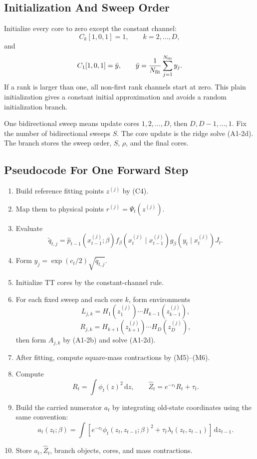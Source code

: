 \documentclass[11pt]{article}
\newcommand{\dd}{\,\mathrm d}
\begin{document}
\subsection{Initialization And Sweep Order}

Initialize every core to zero except the constant channel:
\[
    C_k[1,0,1]=1,\qquad k=2,\ldots,D,
\]
and
\[
    C_1[1,0,1]=\bar y,\qquad
    \bar y=\frac1{N_{\rm fit}}\sum_{j=1}^{N_{\rm fit}}y_j.
\]
If a rank is larger than one, all non-first rank channels start at zero.  This
plain initialization gives a constant initial approximation and avoids a random
initialization branch.

One bidirectional sweep means update cores \(1,2,\ldots,D\), then
\(D,D-1,\ldots,1\).  Fix the number of bidirectional sweeps \(S\).  The core
update is the ridge solve (A1-2d).  The branch stores the sweep order, \(S\),
\(\rho\), and the final cores.

\subsection{Pseudocode For One Forward Step}

\begin{enumerate}[leftmargin=2em]
\item Build reference fitting points \(z^{(j)}\) by (C4).
\item Map them to physical points \(r^{(j)}=\Psi_t(z^{(j)})\).
\item Evaluate
\[
    \widetilde q_{t,j}
    =
    \widehat p_{t-1}(x_{t-1}^{(j)};\beta)
    f_\beta(x_t^{(j)}\mid x_{t-1}^{(j)})
    g_\beta(y_t\mid x_t^{(j)})J_t.
\]
\item Form \(y_j=\exp(c_t/2)\sqrt{\widetilde q_{t,j}}\).
\item Initialize TT cores by the constant-channel rule.
\item For each fixed sweep and each core \(k\), form environments
\[
    L_{j,k}=H_1(z_1^{(j)})\cdots H_{k-1}(z_{k-1}^{(j)}),
\]
\[
    R_{j,k}=H_{k+1}(z_{k+1}^{(j)})\cdots H_D(z_D^{(j)}),
\]
then form \(A_{j,k}\) by (A1-2b) and solve (A1-2d).
\item After fitting, compute square-mass contractions by (M5)--(M6).
\item Compute
\[
    R_t=\int\phi_t(z)^2\dd z,\qquad
    \widehat Z_t=e^{-c_t}R_t+\tau_t.
\]
\item Build the carried numerator \(a_t\) by integrating old-state coordinates
using the same convention:
\[
    a_t(z_t;\beta)
    =
    \int
    \left[e^{-c_t}\phi_t(z_t,z_{t-1};\beta)^2
    +\tau_t\lambda_t(z_t,z_{t-1})\right]\dd z_{t-1}.
\]
\item Store \(a_t,\widehat Z_t\), branch objects, cores, and mass contractions.
\end{enumerate}
\end{document}
